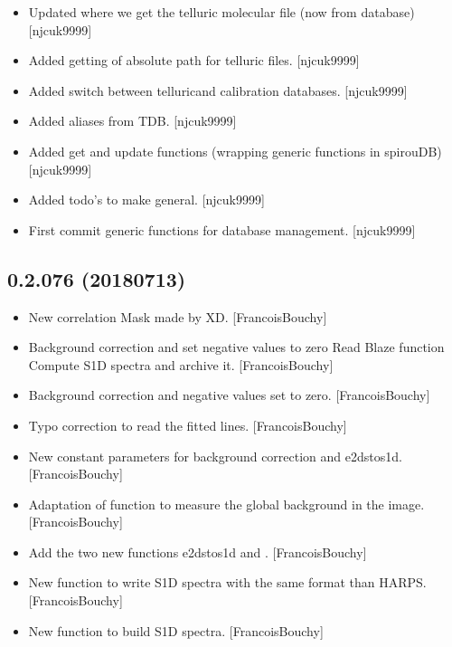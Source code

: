 \documentclass[a4paper,10pt,english]{report}
\begin{document}
\begin{itemize}
\item {} 
Updated where we get the telluric molecular file (now from database)
{[}njcuk9999{]}

\item {} 
Added getting of absolute path for telluric files. {[}njcuk9999{]}

\item {} 
Added switch between telluricand calibration databases. {[}njcuk9999{]}

\item {} 
Added aliases from TDB. {[}njcuk9999{]}

\item {} 
Added get and update functions (wrapping generic functions in
spirouDB) {[}njcuk9999{]}

\item {} 
Added todo’s to make general. {[}njcuk9999{]}

\item {} 
First commit \sphinxhyphen{} generic functions for database management. {[}njcuk9999{]}

\end{itemize}


\subsection{0.2.076 (2018\sphinxhyphen{}07\sphinxhyphen{}13)}
\label{\detokenize{misc/changelog:id414}}\begin{itemize}
\item {} 
New correlation Mask made by XD. {[}FrancoisBouchy{]}

\item {} 
Background correction and set negative values to zero Read Blaze
function Compute S1D spectra and archive it. {[}FrancoisBouchy{]}

\item {} 
Background correction and negative values set to zero.
{[}FrancoisBouchy{]}

\item {} 
Typo correction to read the fitted lines. {[}FrancoisBouchy{]}

\item {} 
New constant parameters for background correction and e2dstos1d.
{[}FrancoisBouchy{]}

\item {} 
Adaptation of function to measure the global background in the image.
{[}FrancoisBouchy{]}

\item {} 
Add the two new functions e2dstos1d and . {[}FrancoisBouchy{]}

\item {} 
New function to write S1D spectra with the same format than HARPS.
{[}FrancoisBouchy{]}

\item {} 
New function to build S1D spectra. {[}FrancoisBouchy{]}

\end{itemize}
\end{document}
